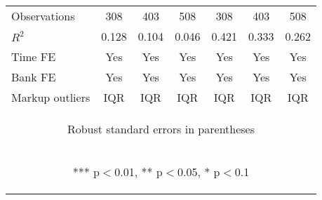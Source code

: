 \documentclass[]{article}
\begin{document}
\begin{center}
\begin{tabular}{lcccccc}
Observations & 308 & 403 & 508 & 308 & 403 & 508 \\
$R^2$ & 0.128 & 0.104 & 0.046 & 0.421 & 0.333 & 0.262 \\
Time FE & Yes & Yes & Yes & Yes & Yes & Yes \\
Bank FE & Yes & Yes & Yes & Yes & Yes & Yes \\
 Markup outliers & IQR & IQR & IQR & IQR & IQR & IQR \\ \hline
\multicolumn{7}{c}{\begin{footnotesize} Robust standard errors in parentheses\end{footnotesize}} \\
\multicolumn{7}{c}{\begin{footnotesize} *** p$<$0.01, ** p$<$0.05, * p$<$0.1\end{footnotesize}} \\
\end{tabular}
\end{center}
\end{document}
